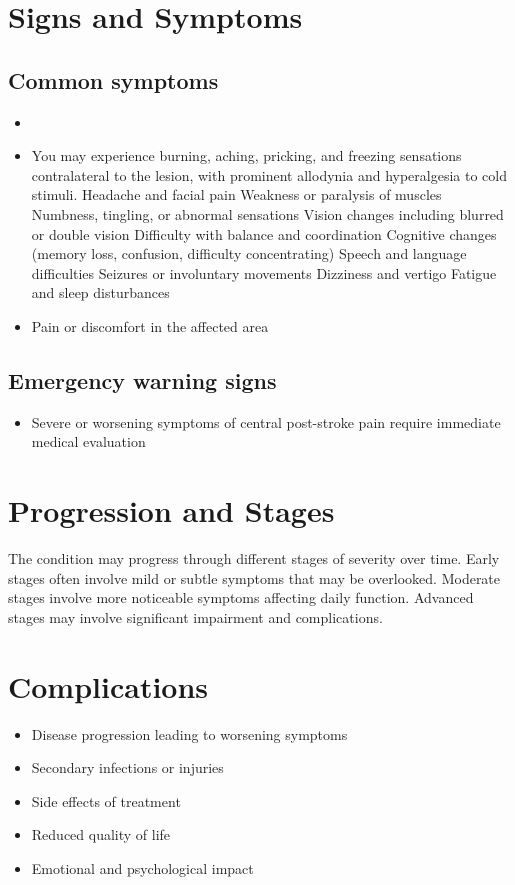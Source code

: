 \section{Signs and Symptoms}
\subsection{Common symptoms}
\begin{itemize}[noitemsep]
  \item \item You may experience burning, aching, pricking, and freezing sensations contralateral to the lesion, with prominent allodynia and hyperalgesia to cold stimuli. Headache and facial pain Weakness or paralysis of muscles Numbness, tingling, or abnormal sensations Vision changes including blurred or double vision Difficulty with balance and coordination Cognitive changes (memory loss, confusion, difficulty concentrating) Speech and language difficulties Seizures or involuntary movements Dizziness and vertigo Fatigue and sleep disturbances
  \item Pain or discomfort in the affected area
  \end{itemize}
\subsection{Emergency warning signs}
\begin{itemize}[noitemsep]
  \item Severe or worsening symptoms of central post-stroke pain require immediate medical evaluation
\end{itemize}
\section{Progression and Stages}
The condition may progress through different stages of severity over time. Early stages often involve mild or subtle symptoms that may be overlooked. Moderate stages involve more noticeable symptoms affecting daily function. Advanced stages may involve significant impairment and complications.
\section{Complications}
\begin{itemize}[noitemsep]
  \item Disease progression leading to worsening symptoms
  \item Secondary infections or injuries
  \item Side effects of treatment
  \item Reduced quality of life
  \item Emotional and psychological impact
\end{itemize}
